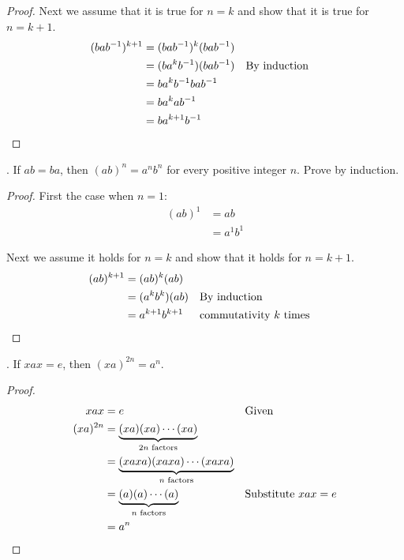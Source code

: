 \documentclass[twoside]{amsart}
\begin{document}
\begin{enumerate}[A.]
\begin{proof}
   Next we assume that it is true for $n=k$ and show that it is
   true for $n=k+1$.
      \begin{align*}
         (bab^{-1})^{k+1} & = (bab^{-1})^k(bab^{-1}) \\
	                  & = (ba^kb^{-1})(bab^{-1}) && \text{By induction}\\
			  & = ba^kb^{-1}bab^{-1} \\
			  & = ba^kab^{-1} \\
			  & = ba^{k+1}b^{-1} \qedhere
      \end{align*}
   \end{proof}

   . If $ab = ba$, then $(ab)^n = a^nb^n$ for every positive 
   integer $n$. Prove by induction.
   \begin{proof}
   First the case when $n=1$:
      \begin{align*}
         (ab)^1 & = ab \\
                & = a^1b^1
      \end{align*}

   Next we assume it holds for $n=k$ and show that it holds for
   $n=k+1$.
      \begin{align*}
         (ab)^{k+1} & = (ab)^k(ab) \\
	            & = (a^kb^k)(ab) && \text{By induction} \\
		    & = a^{k+1}b^{k+1} && \text{commutativity $k$ times}
		        \qedhere
      \end{align*}
   \end{proof}

   . If $xax=e$, then $(xa)^{2n} = a^n$.

   \begin{proof}
      \begin{align*}
         xax & = e        && \text{Given} \\
	 (xa)^{2n} & = \underbrace{(xa)(xa)\cdots (xa)}_{2n \text{ factors}}\\
	           & = 
		   \underbrace{(xaxa)(xaxa)\cdots(xaxa)}_{n \text{ factors}}\\
		   & = \underbrace{(a)(a)\cdots(a)}_{n \text{ factors}} 
		       && \text{Substitute $xax=e$} \\
		   & = a^n \qedhere
      \end{align*}
   \end{proof}
\end{enumerate}
\end{document}

